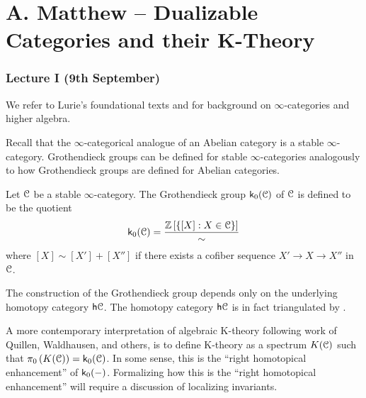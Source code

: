 \part*{A. Matthew -- Dualizable Categories and their K-Theory}
\section{Lecture I (9th September)}\label{sec: Matthew I}
We refer to Lurie's foundational texts \cite{HTT} and \cite{HA} for background on $\infty$-categories and higher algebra. 

Recall that the $\infty$-categorical analogue of an Abelian category is a stable $\infty$-category. Grothendieck groups can be defined for stable $\infty$-categories analogously to how Grothendieck groups are defined for Abelian categories. 
\begin{definition}\label{def: Grothendieck group}
    Let $\EuScript{C}$ be a stable $\infty$-category. The Grothendieck group $\mathsf{k}_{0}(\EuScript{C})$ of $\EuScript{C}$ is defined to be the quotient
    $$\mathsf{k}_{0}(\EuScript{C})=\frac{\mathbb{Z}\left[\left\{[X]:X\in\EuScript{C}\right\}\right]}{\sim}$$
    where $[X]\sim[X']+[X'']$ if there exists a cofiber sequence $X'\to X\to X''$ in $\EuScript{C}$. 
\end{definition}
\begin{remark}
    The construction of the Grothendieck group depends only on the underlying homotopy category $\mathsf{h}\EuScript{C}$. The homotopy category $\mathsf{h}\EuScript{C}$ is in fact triangulated by \cite[Thm. 1.1.2.4]{HA}.
\end{remark}
A more contemporary interpretation of algebraic K-theory following work of Quillen, Waldhausen, and others, is to define K-theory as a spectrum $K(\EuScript{C})$ such that $\pi_{0}\left(K(\EuScript{C})\right)=\mathsf{k}_{0}(\EuScript{C})$. In some sense, this is the ``right  homotopical enhancement'' of $\mathsf{k}_{0}(-)$. Formalizing how this is the ``right homotopical enhancement'' will require a discussion of localizing invariants. 

